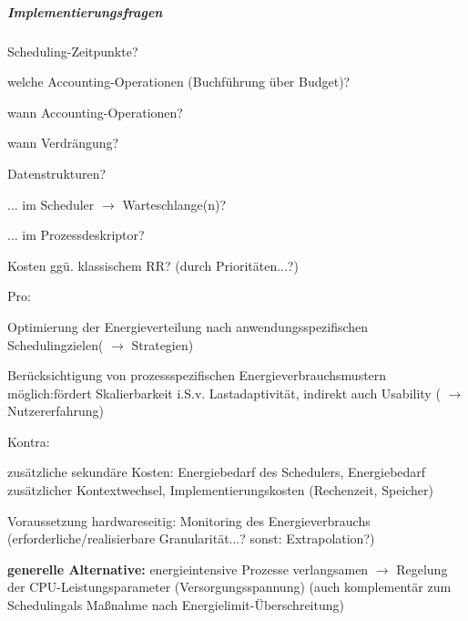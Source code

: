 \documentclass[a4paper]{article}
\begin{document}
\begin{multicols}{3}
    \subparagraph{Implementierungsfragen}
    \begin{itemize*}
        \item
        Scheduling-Zeitpunkte?
        \begin{itemize*}
            \item welche Accounting-Operationen (Buchführung über Budget)?
            \item wann Accounting-Operationen?
            \item wann Verdrängung?
        \end{itemize*}
        \item
        Datenstrukturen?
        \begin{itemize*}
            \item ... im Scheduler $\rightarrow$ Warteschlange(n)?
            \item ... im Prozessdeskriptor?
        \end{itemize*}
        \item
        Kosten ggü. klassischem RR? (durch Prioritäten...?)
        \item
        Pro:
        \begin{itemize*}
            \item Optimierung der Energieverteilung nach anwendungsspezifischen Schedulingzielen( $\rightarrow$ Strategien)
            \item Berücksichtigung von prozessspezifischen Energieverbrauchsmustern möglich:fördert Skalierbarkeit i.S.v. Lastadaptivität, indirekt auch Usability ( $\rightarrow$ Nutzererfahrung)
        \end{itemize*}
        \item
        Kontra:
        \begin{itemize*}
            \item zusätzliche sekundäre Kosten: Energiebedarf des Schedulers, Energiebedarf zusätzlicher Kontextwechsel, Implementierungskosten (Rechenzeit, Speicher)
            \item Voraussetzung hardwareseitig: Monitoring des Energieverbrauchs (erforderliche/realisierbare Granularität...? sonst: Extrapolation?)
        \end{itemize*}
        \item
        \textbf{generelle Alternative:} energieintensive Prozesse verlangsamen
        $\rightarrow$ Regelung der CPU-Leistungsparameter
        (Versorgungsspannung) (auch komplementär zum Schedulingals Maßnahme
        nach Energielimit-Überschreitung)

\end{itemize*}
\end{multicols}
\end{document}
